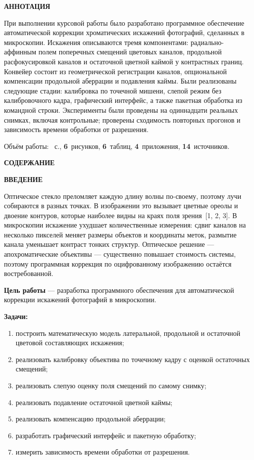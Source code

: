 \documentclass[a4paper,14pt,oneside]{extreport}
\newcommand{\structural}[1]{%
  \clearpage
  \addcontentsline{toc}{section}{#1}%
  {\centering\bfseries #1\par}%
  \vspace{\baselineskip}%
}
\begin{document}
\setcounter{page}{2}
\structural{АННОТАЦИЯ}

При выполнении курсовой работы было разработано программное обеспечение автоматической коррекции хроматических искажений фотографий, сделанных в микроскопии. Искажения описываются тремя компонентами: радиально-аффинным полем поперечных смещений цветовых каналов, продольной расфокусировкой каналов и остаточной цветной каймой у контрастных границ.
Конвейер состоит из геометрической регистрации каналов, опциональной
компенсации продольной аберрации и подавления каймы. Были реализованы следующие стадии: калибровка
по точечной мишени, слепой режим без калибровочного кадра, графический
интерфейс, а также пакетная обработка из командной строки. Эксперименты были проведены
на одиннадцати реальных снимках, включая контрольные; проверены сходимость
повторных прогонов и зависимость времени обработки от разрешения.

Объём работы: \pageref{LastPage}~с., \textbf{6}~рисунков,
\textbf{6}~таблиц, \textbf{4}~приложения, \textbf{14}~источников.

\clearpage
{\centering\bfseries СОДЕРЖАНИЕ\par}
\vspace{\baselineskip}
{\linespread{1}\selectfont\tableofcontents}
\clearpage

\structural{ВВЕДЕНИЕ}

Оптическое стекло преломляет каждую длину волны по-своему, поэтому лучи
собираются в разных точках. В изображении
это вызывает цветные ореолы и двоение контуров, которые наиболее видны на краях поля
зрения~[1, 2, 3]. В микроскопии искажение ухудшает количественные измерения:
сдвиг каналов на несколько пикселей меняет размеры объектов и координаты
меток, размытие канала уменьшает контраст тонких структур. Оптическое решение
--- апохроматические объективы --- существенно повышает стоимость системы, поэтому
программная коррекция по оцифрованному изображению остаётся востребованной.

\textbf{Цель работы} --- разработка программного обеспечения для
автоматической коррекции искажений фотографий в микроскопии.

\textbf{Задачи:}
\begin{enumerate}
\item построить математическую модель латеральной, продольной и остаточной
цветовой составляющих искажения;
\item реализовать калибровку объектива по точечному кадру с оценкой
остаточных смещений;
\item реализовать слепую оценку поля смещений по самому снимку;
\item реализовать подавление остаточной цветной каймы;
\item реализовать компенсацию продольной аберрации;
\item разработать графический интерфейс и пакетную обработку;
\item измерить зависимость времени обработки от разрешения.
\end{enumerate}
\end{document}
